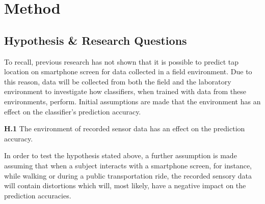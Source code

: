 \chapter{Method\label{cha:chapter5}}

\section{Hypothesis \& Research Questions}
\label{sec:hypothesis}
To recall, previous research has not shown that it is possible to predict tap location on smartphone screen for data collected in a field environment. Due to this reason, data will be collected from both the field and the laboratory environment to investigate how classifiers, when trained with data from these environments, perform.
Initial assumptions are made that the environment has an effect on the classifier's prediction accuracy.

\begin{center}
  \begin{mdframed}[backgroundcolor=gray!10] 
    \textbf{H.1}  The environment of recorded sensor data has an effect on the prediction accuracy.
  \end{mdframed}
\end{center}

In order to test the hypothesis stated above, a further assumption is made assuming that when a subject interacts with a smartphone screen, for instance, while walking or during a public transportation ride, the recorded sensory data will contain distortions which will, most likely, have a negative impact on the prediction accuracies. 

